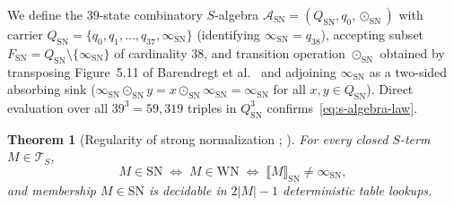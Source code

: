 \documentclass[11pt,reqno]{amsart}
\numberwithin{equation}{section}
\theoremstyle{plain}
\newtheorem{theorem}{Theorem}[section]
\theoremstyle{definition}
\theoremstyle{remark}
\newcommand{\TS}{\mathcal{T}_S}
\newcommand{\SN}{\mathrm{SN}}
\newcommand{\WN}{\mathrm{WN}}
\newcommand{\sem}[1]{\llbracket #1 \rrbracket}
\begin{document}
We define the $39$-state combinatory $S$-algebra $\mathcal{A}_{\SN} = (Q_{\SN}, q_0, \odot_{\SN})$ with carrier $Q_{\SN} = \{q_0, q_1, \dots, q_{37}, \infty_{\SN}\}$ (identifying $\infty_{\SN} = q_{38}$), accepting subset $F_{\SN} = Q_{\SN} \setminus \{\infty_{\SN}\}$ of cardinality $38$, and transition operation $\odot_{\SN}$ obtained by transposing Figure~5.11 of Barendregt et al.~\cite[p.~82]{BarendregtEndrullisKlopWaldmann2017} and adjoining $\infty_{\SN}$ as a two-sided absorbing sink ($\infty_{\SN} \odot_{\SN} y = x \odot_{\SN} \infty_{\SN} = \infty_{\SN}$ for all $x, y \in Q_{\SN}$). Direct evaluation over all $39^3 = 59{,}319$ triples in $Q_{\SN}^3$ confirms~\eqref{eq:s-algebra-law}.

\begin{theorem}[Regularity of strong normalization {\cite{Waldmann2000}; \cite[Theorem~9]{BarendregtEndrullisKlopWaldmann2017}}]\label{thm:waldmann-sn}
For every closed $S$-term $M \in \TS$,
\[
M \in \SN \;\Longleftrightarrow\; M \in \WN \;\Longleftrightarrow\; \sem{M}_{\SN} \neq \infty_{\SN},
\]
and membership $M \in \SN$ is decidable in $2|M| - 1$ deterministic table lookups.
\end{theorem}
\end{document}

